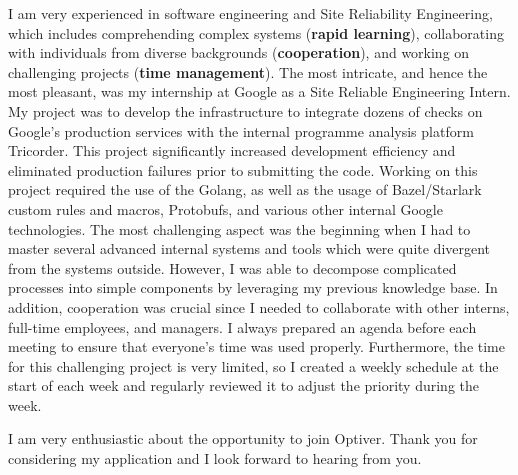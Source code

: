 \documentclass[11pt, a4paper]{awesome-cv}
\begin{document}
\begin{cvletter}
I am very experienced in software engineering and Site Reliability Engineering, which includes comprehending complex systems (\textbf{rapid learning}), collaborating with individuals from diverse backgrounds (\textbf{cooperation}), and working on challenging projects (\textbf{time management}). The most intricate, and hence the most pleasant, was my internship at Google as a Site Reliable Engineering Intern. My project was to develop the infrastructure to integrate dozens of checks on Google’s production services with the internal programme analysis platform Tricorder. This project significantly increased development efficiency and eliminated production failures prior to submitting the code. Working on this project required the use of the Golang, as well as the usage of Bazel/Starlark custom rules and macros, Protobufs, and various other internal Google technologies. The most challenging aspect was the beginning when I had to master several advanced internal systems and tools which were quite divergent from the systems outside. However, I was able to decompose complicated processes into simple components by leveraging my previous knowledge base. In addition, cooperation was crucial since I needed to collaborate with other interns, full-time employees, and managers. I always prepared an agenda before each meeting to ensure that everyone’s time was used properly. Furthermore, the time for this challenging project is very limited, so I created a weekly schedule at the start of each week and regularly reviewed it to adjust the priority during the week. 

I am very enthusiastic about the opportunity to join Optiver. Thank you for considering my application and I look forward to hearing from you. 
\end{cvletter}


\makeletterclosing
\end{document}

